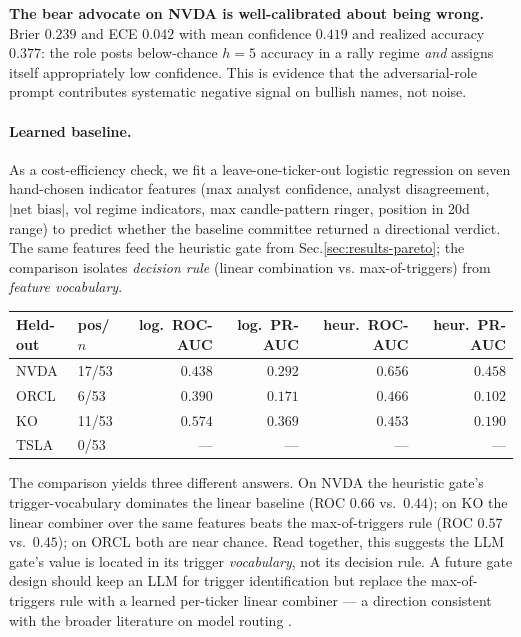 \documentclass[11pt,a4paper]{article}
\begin{document}
\textbf{The bear advocate on NVDA is well-calibrated about being
wrong.} Brier $0.239$ and ECE $0.042$ with mean confidence $0.419$
and realized accuracy $0.377$: the role posts below-chance $h{=}5$
accuracy in a rally regime \emph{and} assigns itself appropriately
low confidence. This is evidence that the adversarial-role prompt
contributes systematic negative signal on bullish names, not noise.

\paragraph{Learned baseline.}
As a cost-efficiency check, we fit a leave-one-ticker-out logistic
regression on seven hand-chosen indicator features (max analyst
confidence, analyst disagreement, $|\text{net bias}|$, vol regime
indicators, max candle-pattern ringer, position in 20d range) to
predict whether the baseline committee returned a directional
verdict. The same features feed the heuristic gate from
Sec.\ref{sec:results-pareto}; the comparison isolates \emph{decision
rule} (linear combination vs. max-of-triggers) from \emph{feature
vocabulary}.

\begin{center}\footnotesize
\begin{tabular}{llrrrr}
\toprule
Held-out & pos/$n$ & log.\ ROC-AUC & log.\ PR-AUC & heur.\ ROC-AUC & heur.\ PR-AUC \\
\midrule
NVDA & 17/53 & $0.438$ & $0.292$ & $\mathbf{0.656}$ & $\mathbf{0.458}$ \\
ORCL &  6/53 & $0.390$ & $0.171$ & $0.466$ & $0.102$ \\
KO   & 11/53 & $\mathbf{0.574}$ & $\mathbf{0.369}$ & $0.453$ & $0.190$ \\
TSLA &  0/53 & --- & --- & --- & --- \\
\bottomrule
\end{tabular}
\end{center}

The comparison yields three different answers. On NVDA the heuristic
gate's trigger-vocabulary dominates the linear baseline (ROC $0.66$
vs.\ $0.44$); on KO the linear combiner over the same features beats
the max-of-triggers rule (ROC $0.57$ vs.\ $0.45$); on ORCL both are
near chance. Read together, this suggests the LLM gate's value is
located in its trigger \emph{vocabulary}, not its decision rule. A
future gate design should keep an LLM for trigger identification but
replace the max-of-triggers rule with a learned per-ticker linear
combiner --- a direction consistent with the broader literature on
model routing \citep{ong2024routellm, chen2023frugalgpt}.
\end{document}
